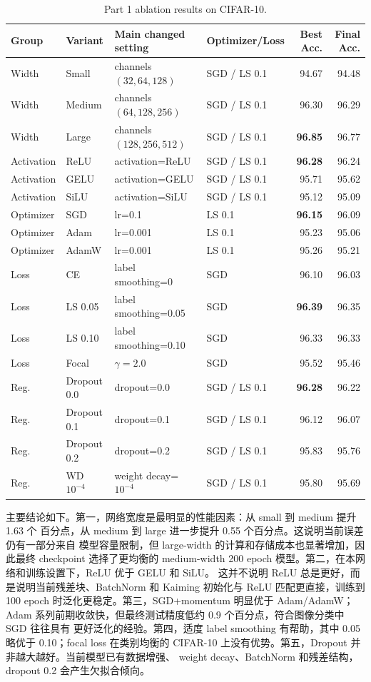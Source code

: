 \documentclass[11pt,a4paper]{ctexart}
\begin{document}
\begin{table}[H]
\centering
\scriptsize
\caption{Part 1 ablation results on CIFAR-10.}
\label{tab:part1-ablation}
\begin{tabular}{llllrr}
\toprule
Group & Variant & Main changed setting & Optimizer/Loss & Best Acc. & Final Acc. \\
\midrule
Width & Small & channels $(32,64,128)$ & SGD / LS 0.1 & 94.67 & 94.48 \\
Width & Medium & channels $(64,128,256)$ & SGD / LS 0.1 & 96.30 & 96.29 \\
Width & Large & channels $(128,256,512)$ & SGD / LS 0.1 & \textbf{96.85} & 96.77 \\
\midrule
Activation & ReLU & activation=ReLU & SGD / LS 0.1 & \textbf{96.28} & 96.24 \\
Activation & GELU & activation=GELU & SGD / LS 0.1 & 95.71 & 95.62 \\
Activation & SiLU & activation=SiLU & SGD / LS 0.1 & 95.12 & 95.09 \\
\midrule
Optimizer & SGD & lr=0.1 & LS 0.1 & \textbf{96.15} & 96.09 \\
Optimizer & Adam & lr=0.001 & LS 0.1 & 95.23 & 95.06 \\
Optimizer & AdamW & lr=0.001 & LS 0.1 & 95.26 & 95.21 \\
\midrule
Loss & CE & label smoothing=0 & SGD & 96.10 & 96.03 \\
Loss & LS 0.05 & label smoothing=0.05 & SGD & \textbf{96.39} & 96.35 \\
Loss & LS 0.10 & label smoothing=0.10 & SGD & 96.33 & 96.33 \\
Loss & Focal & $\gamma=2.0$ & SGD & 95.52 & 95.46 \\
\midrule
Reg. & Dropout 0.0 & dropout=0.0 & SGD / LS 0.1 & \textbf{96.28} & 96.22 \\
Reg. & Dropout 0.1 & dropout=0.1 & SGD / LS 0.1 & 96.12 & 96.07 \\
Reg. & Dropout 0.2 & dropout=0.2 & SGD / LS 0.1 & 95.83 & 95.76 \\
Reg. & WD $10^{-4}$ & weight decay=$10^{-4}$ & SGD / LS 0.1 & 95.80 & 95.69 \\
\bottomrule
\end{tabular}
\end{table}

主要结论如下。第一，网络宽度是最明显的性能因素：从 small 到 medium 提升 1.63 个
百分点，从 medium 到 large 进一步提升 0.55 个百分点。这说明当前误差仍有一部分来自
模型容量限制，但 large-width 的计算和存储成本也显著增加，因此最终 checkpoint
选择了更均衡的 medium-width 200 epoch 模型。第二，在本网络和训练设置下，ReLU 优于 GELU 和 SiLU。
这并不说明 ReLU 总是更好，而是说明当前残差块、BatchNorm 和 Kaiming 初始化与 ReLU
匹配更直接，训练到 100 epoch 时泛化更稳定。第三，SGD+momentum 明显优于 Adam/AdamW；
Adam 系列前期收敛快，但最终测试精度低约 0.9 个百分点，符合图像分类中 SGD 往往具有
更好泛化的经验。第四，适度 label smoothing 有帮助，其中 0.05 略优于 0.10；focal loss
在类别均衡的 CIFAR-10 上没有优势。第五，Dropout 并非越大越好。当前模型已有数据增强、
weight decay、BatchNorm 和残差结构，dropout 0.2 会产生欠拟合倾向。
\end{document}
